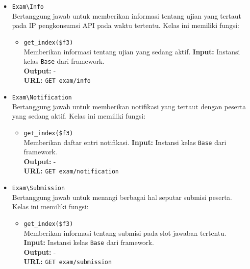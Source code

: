 \begin{itemize}
        \item \texttt{Exam\textbackslash Info} \\
            Bertanggung jawab untuk memberikan informasi tentang ujian yang
            tertaut pada IP pengkonsumsi API pada waktu tertentu. Kelas ini
            memiliki fungsi:
            \begin{itemize}
                \item \texttt{get\_index(\$f3)} \\
                    Memberikan informasi tentang ujian yang sedang aktif.
                    \textbf{Input:} Instansi kelas \texttt{Base} dari
                    framework.\\
                    \textbf{Output:} - \\
                    \textbf{URL:} \texttt{GET exam/info}
            \end{itemize}
            
        \item \texttt{Exam\textbackslash Notification} \\
            Bertanggung jawab untuk memberikan notifikasi yang tertaut dengan
            peserta yang sedang aktif. Kelas ini memiliki fungsi:
            \begin{itemize}
                \item \texttt{get\_index(\$f3)} \\
                    Memberikan daftar entri notifikasi. \textbf{Input:} Instansi
                    kelas \texttt{Base} dari framework.\\
                    \textbf{Output:} -\\
                    \textbf{URL:} \texttt{GET exam/notification}
            \end{itemize}
            
        \item \texttt{Exam\textbackslash Submission} \\
            Bertanggung jawab untuk menangi berbagai hal seputar submisi
            peserta. Kelas ini memiliki fungsi:
            \begin{itemize}
                \item \texttt{get\_index(\$f3)} \\
                    Memberikan informasi tentang submisi pada slot jawaban
                    tertentu. \textbf{Input:} Instansi kelas \texttt{Base} dari
                    framework.\\
                    \textbf{Output:} -\\
                    \textbf{URL:} \texttt{GET exam/submission}
                    

\end{itemize}
\end{itemize}
